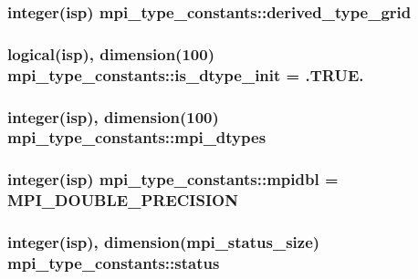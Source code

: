 \subsubsection[{\texorpdfstring{derived\+\_\+type\+\_\+grid}{derived_type_grid}}]{\setlength{\rightskip}{0pt plus 5cm}integer(isp) mpi\+\_\+type\+\_\+constants\+::derived\+\_\+type\+\_\+grid}\hypertarget{namespacempi__type__constants_a4463600d2b1297b8b25562589ae2ed28}{}\label{namespacempi__type__constants_a4463600d2b1297b8b25562589ae2ed28}
\subsubsection[{\texorpdfstring{is\+\_\+dtype\+\_\+init}{is_dtype_init}}]{\setlength{\rightskip}{0pt plus 5cm}logical(isp), dimension(100) mpi\+\_\+type\+\_\+constants\+::is\+\_\+dtype\+\_\+init = .T\+R\+U\+E.}\hypertarget{namespacempi__type__constants_ad8671c5eb1d13c7171bfb4617dab9a38}{}\label{namespacempi__type__constants_ad8671c5eb1d13c7171bfb4617dab9a38}
\subsubsection[{\texorpdfstring{mpi\+\_\+dtypes}{mpi_dtypes}}]{\setlength{\rightskip}{0pt plus 5cm}integer(isp), dimension(100) mpi\+\_\+type\+\_\+constants\+::mpi\+\_\+dtypes}\hypertarget{namespacempi__type__constants_a17a815d34db410fbd4e9591e3a0fdd96}{}\label{namespacempi__type__constants_a17a815d34db410fbd4e9591e3a0fdd96}
\subsubsection[{\texorpdfstring{mpidbl}{mpidbl}}]{\setlength{\rightskip}{0pt plus 5cm}integer(isp) mpi\+\_\+type\+\_\+constants\+::mpidbl = M\+P\+I\+\_\+\+D\+O\+U\+B\+L\+E\+\_\+\+P\+R\+E\+C\+I\+S\+I\+ON}\hypertarget{namespacempi__type__constants_a19270446a7b267fa3b13821e93b1744f}{}\label{namespacempi__type__constants_a19270446a7b267fa3b13821e93b1744f}
\subsubsection[{\texorpdfstring{status}{status}}]{\setlength{\rightskip}{0pt plus 5cm}integer(isp), dimension(mpi\+\_\+status\+\_\+size) mpi\+\_\+type\+\_\+constants\+::status}\hypertarget{namespacempi__type__constants_a364a6ee99d8c7ba31bde4f8d2108beaa}{}\label{namespacempi__type__constants_a364a6ee99d8c7ba31bde4f8d2108beaa}
